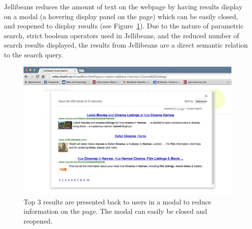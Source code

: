\documentclass[a4paper, 11pt]{article}
\begin{document}
\vspace{5mm}
Jellibeans reduces the amount of text on the webpage by having results display on a modal (a hovering display panel on the page) which can be easily closed, and reopened to display results (see Figure~\ref{resultsModal}). Due to the nature of parametric search, strict boolean operators used in Jellibeans, and the reduced number of search results displayed, the results from Jellibeans are a direct semantic relation to the search query. 

\begin{figure}[H]
\begin{center}
\includegraphics[scale=0.25]{ResultsModal}
\end{center}
\caption{Top 3 results are presented back to users in a modal to reduce information on the page. The modal can easily be closed and reopened.}
\label{resultsModal}
\end{figure}

\end{document}
